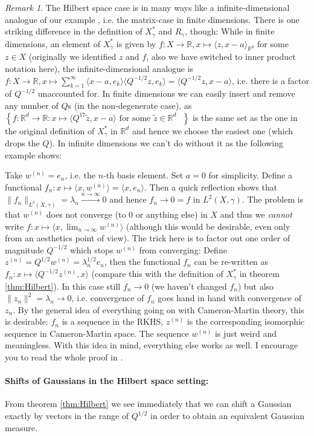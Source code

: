 \documentclass{scrartcl}
\theoremstyle{definition}
\theoremstyle{remark}
\newtheorem{remark}{Remark}
\newcommand{\R}{\mathbb R}
\newcommand*\circled[1]{\tikz[baseline=(char.base)]{
            \node[shape=circle,draw,inner sep=2pt] (char) {#1};}}
\begin{document}
{\begin{remark}
The Hilbert space case is in many ways like a infinite-dimensional analogue of our example \circled{1}, i.e. the matrix-case in finite dimensions. There is one striking difference in the definition of $X_\gamma^*$ and $R_\gamma$, though: While in finite dimensions, an element of $X_\gamma^*$ is given by $f: X\to \R, x\mapsto \langle z, x-a\rangle_{\R^d}$ for some $z\in X$ (originally we identified $z$ and $f$, also we have switched to inner product notation here), the infinite-dimensional analogue is $f: X\to \R, x\mapsto \sum_{k=1}^\infty \langle x-a, e_k\rangle\langle Q^{-1/2}z, e_k\rangle = \langle Q^{-1/2}z, x-a\rangle$, i.e. there is a factor of $Q^{-1/2}$ unaccounted for. In finite dimensions we can easily insert and remove any number of $Q$s (in the non-degenerate case), as $\left\{f:\R^d\to\R: x\mapsto \langle Q^{17}\tilde z, x-a\rangle\text{ for some $\tilde z\in \R^d$ }\right\}$ is the same set as the one in the original definition of $X_\gamma^*$ in $\R^d$ and hence we choose the easiest one (which drops the $Q$). In infinite dimensions we can't do without it as the following example shows:

Take $w^{(n)} = e_n$, i.e. the $n$-th basis element. Set $a=0$ for simplicity. Define a functional $f_n: x\mapsto \langle x, w^{(n)}\rangle = \langle x, e_n\rangle$. Then a quick reflection shows that $\|f_n\|_{L^2(X,\gamma)} = \lambda_n \xrightarrow{n\to\infty} 0$ and hence $f_n\to 0 = f$ in $L^2(X,\gamma)$. The problem is that $w^{(n)}$ does not converge (to $0$ or anything else) in $X$ and thus we \textit{cannot} write $f: x\mapsto \langle x, \lim_{n\to\infty} w^{(n)}\rangle$ (although this would be desirable, even only from an aesthetics point of view). The trick here is to factor out one order of magnitude $Q^{-1/2}$ which stops $w^{(n)}$ from converging:
 Define $z^{(n)} = Q^{1/2} w^{(n)} = \lambda_n^{1/2} e_n$, then    the functional $f_n$ can be re-written as $f_n: x\mapsto \langle Q^{-1/2} z^{(n)}, x\rangle$ (compare this with the definition of $X_\gamma^*$ in theorem \ref{thm:Hilbert}). In this case still $f_n\to 0$ (we haven't changed $f_n$) but also $\|z_n\|^2 = \lambda_n \to 0$, i.e. convergence of $f_n$ goes hand in hand with convergence of $z_n$. By the general idea of everything going on with Cameron-Martin theory, this is desirable: $f_n$ is a sequence in the RKHS, $z^{(n)}$ is the corresponding isomorphic sequence in Cameron-Martin space. The sequence $w^{(n)}$ is just weird and meaningless. With this idea in mind, everything else works as well. I encourage you to read the whole proof in \cite{Lunardi}.
\end{remark}
\paragraph{Shifts of Gaussians in the Hilbert space setting:} From theorem \ref{thm:Hilbert} we see immediately that we can shift a Gaussian exactly by vectors in the range of $Q^{1/2}$ in order to obtain an equivalent Gaussian measure.}
\end{document}
